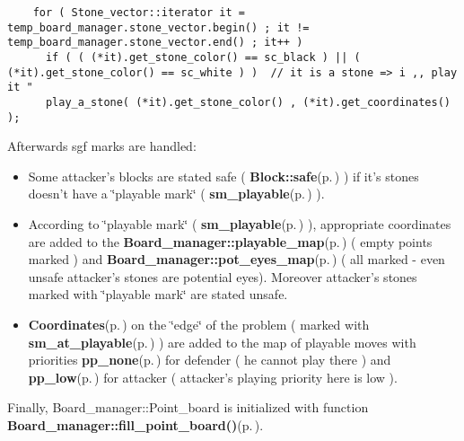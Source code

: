 \footnotesize\begin{verbatim}    for ( Stone_vector::iterator it = temp_board_manager.stone_vector.begin() ; it != temp_board_manager.stone_vector.end() ; it++ )
      if ( ( (*it).get_stone_color() == sc_black ) || ( (*it).get_stone_color() == sc_white ) )  // it is a stone => i ,, play it " 
      play_a_stone( (*it).get_stone_color() , (*it).get_coordinates() );  
\end{verbatim}
\normalsize


Afterwards sgf marks are handled:\begin{itemize}
\item Some attacker's blocks are stated safe ( {\bf Block::safe}{\rm (p.\,\pageref{classBlock_r4})} ) if it's stones doesn't have a \char`\"{}playable mark\char`\"{} ( {\bf sm\_\-playable}{\rm (p.\,\pageref{board_8h_a50a19})} ).\item According to \char`\"{}playable mark\char`\"{} ( {\bf sm\_\-playable}{\rm (p.\,\pageref{board_8h_a50a19})} ), appropriate coordinates are added to the {\bf Board\_\-manager::playable\_\-map}{\rm (p.\,\pageref{classBoard__manager_r2})} ( empty points marked ) and {\bf Board\_\-manager::pot\_\-eyes\_\-map}{\rm (p.\,\pageref{classBoard__manager_o0})} ( all marked - even unsafe attacker's stones are potential eyes). Moreover attacker's stones marked with \char`\"{}playable mark\char`\"{} are stated unsafe.\item {\bf Coordinates}{\rm (p.\,\pageref{classCoordinates})} on the \char`\"{}edge\char`\"{} of the problem ( marked with {\bf sm\_\-at\_\-playable}{\rm (p.\,\pageref{board_8h_a50a20})} ) are added to the map of playable moves with priorities {\bf pp\_\-none}{\rm (p.\,\pageref{board_8h_a52a33})} for defender ( he cannot play there ) and {\bf pp\_\-low}{\rm (p.\,\pageref{board_8h_a52a30})} for attacker ( attacker's playing priority here is low ).\end{itemize}


Finally, Board\_\-manager::Point\_\-board is initialized with function {\bf Board\_\-manager::fill\_\-point\_\-board()}{\rm (p.\,\pageref{classBoard__manager_a15})}.

